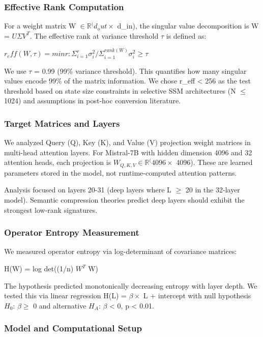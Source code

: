 
\subsubsection{Effective Rank Computation}

For a weight matrix W $\in \mathbb{R}^(d_out \times$ d\_in), the singular value decomposition is W = $U\Sigma V^T$. The effective rank at variance threshold $\tau$ is defined as:

$r_eff(W, \tau ) = min{r : \Sigma _{i=1}^r \sigma _{i}^2 / \Sigma _{i=1}^{rank(W)} \sigma _{i}^2 \geq \tau }$

We use $\tau$ = 0.99 (99\% variance threshold). This quantifies how many singular values encode 99\% of the matrix information. We chose r\_eff < 256 as the test threshold based on state size constraints in selective SSM architectures (N $\leq$ 1024) and assumptions in post-hoc conversion literature.

\subsubsection{Target Matrices and Layers}

We analyzed Query (Q), Key (K), and Value (V) projection weight matrices in multi-head attention layers. For Mistral-7B with hidden dimension 4096 and 32 attention heads, each projection is $W_{Q,K,V} \in \mathbb{R}^(4096 \times$ 4096). These are learned parameters stored in the model, not runtime-computed attention patterns.

Analysis focused on layers 20-31 (deep layers where L $\geq$ 20 in the 32-layer model). Semantic compression theories predict deep layers should exhibit the strongest low-rank signatures.

\subsubsection{Operator Entropy Measurement}

We measured operator entropy via log-determinant of covariance matrices:

H(W) = log det((1/n) $W^T$ W)

The hypothesis predicted monotonically decreasing entropy with layer depth. We tested this via linear regression H(L) = $\beta \times$ L + intercept with null hypothesis $H_0$: $\beta \geq$ 0 and alternative $H_A$: $\beta$ < 0, p < 0.01.

\subsubsection{Model and Computational Setup}

